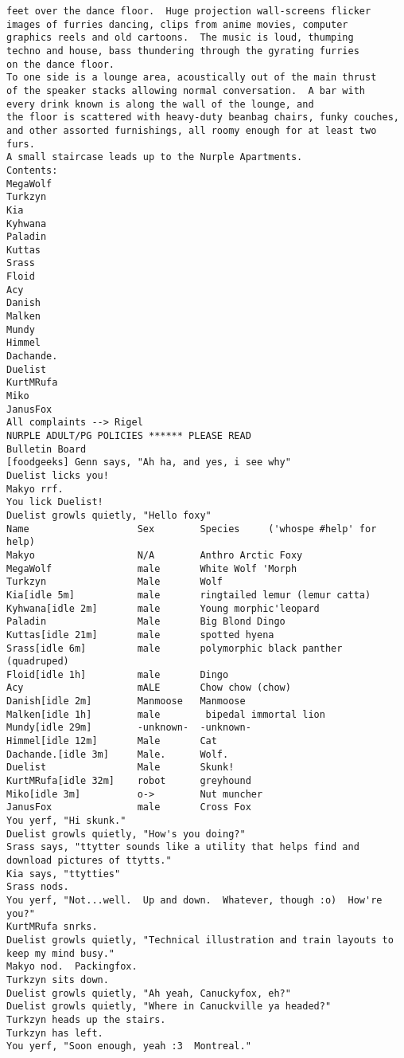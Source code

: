 \begin{verbatim}
feet over the dance floor.  Huge projection wall-screens flicker
images of furries dancing, clips from anime movies, computer
graphics reels and old cartoons.  The music is loud, thumping
techno and house, bass thundering through the gyrating furries
on the dance floor.
To one side is a lounge area, acoustically out of the main thrust
of the speaker stacks allowing normal conversation.  A bar with
every drink known is along the wall of the lounge, and
the floor is scattered with heavy-duty beanbag chairs, funky couches,
and other assorted furnishings, all roomy enough for at least two furs.
A small staircase leads up to the Nurple Apartments.
Contents:
MegaWolf
Turkzyn
Kia
Kyhwana
Paladin
Kuttas
Srass
Floid
Acy
Danish
Malken
Mundy
Himmel
Dachande.
Duelist
KurtMRufa
Miko
JanusFox
All complaints --> Rigel
NURPLE ADULT/PG POLICIES ****** PLEASE READ
Bulletin Board
[foodgeeks] Genn says, "Ah ha, and yes, i see why"
Duelist licks you!
Makyo rrf.
You lick Duelist!
Duelist growls quietly, "Hello foxy"
Name                   Sex        Species     ('whospe #help' for help)
Makyo                  N/A        Anthro Arctic Foxy
MegaWolf               male       White Wolf 'Morph
Turkzyn                Male       Wolf
Kia[idle 5m]           male       ringtailed lemur (lemur catta)
Kyhwana[idle 2m]       male       Young morphic'leopard
Paladin                Male       Big Blond Dingo
Kuttas[idle 21m]       male       spotted hyena
Srass[idle 6m]         male       polymorphic black panther (quadruped)
Floid[idle 1h]         male       Dingo
Acy                    mALE       Chow chow (chow)
Danish[idle 2m]        Manmoose   Manmoose
Malken[idle 1h]        male        bipedal immortal lion
Mundy[idle 29m]        -unknown-  -unknown-
Himmel[idle 12m]       Male       Cat
Dachande.[idle 3m]     Male.      Wolf.
Duelist                Male       Skunk!
KurtMRufa[idle 32m]    robot      greyhound
Miko[idle 3m]          o->        Nut muncher
JanusFox               male       Cross Fox
You yerf, "Hi skunk."
Duelist growls quietly, "How's you doing?"
Srass says, "ttytter sounds like a utility that helps find and download pictures of ttytts."
Kia says, "ttytties"
Srass nods.
You yerf, "Not...well.  Up and down.  Whatever, though :o)  How're you?"
KurtMRufa snrks.
Duelist growls quietly, "Technical illustration and train layouts to keep my mind busy."
Makyo nod.  Packingfox.
Turkzyn sits down.
Duelist growls quietly, "Ah yeah, Canuckyfox, eh?"
Duelist growls quietly, "Where in Canuckville ya headed?"
Turkzyn heads up the stairs.
Turkzyn has left.
You yerf, "Soon enough, yeah :3  Montreal."

\end{verbatim}
